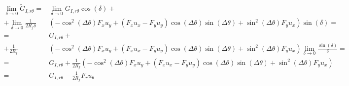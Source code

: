 \documentclass[a4paper]{jpconf}
\begin{document}
\begin{equation}
\begin{split}
\lim_{\delta\rightarrow 0}\widetilde{G}_{I,r\theta} = &\lim_{\delta\rightarrow 0}G_{I,r\theta}\cos\left(\delta\right)+\\
+\lim_{\delta\rightarrow 0}\frac{1}{2R_{f}\delta}&\left(-\cos^{2}\left(\Delta\theta\right) F_{x}u_{y}+\left(F_{x}u_{x}-F_{y}u_{y}\right)\cos\left(\Delta\theta\right)\sin\left(\Delta\theta\right)+\sin^{2}\left(\Delta\theta\right)F_{y}u_{x}\right)\sin\left(\delta\right)=\\
= &G_{I,r\theta}+\\
+\frac{1}{2R_{f}}&\left(-\cos^{2}\left(\Delta\theta\right) F_{x}u_{y}+\left(F_{x}u_{x}-F_{y}u_{y}\right)\cos\left(\Delta\theta\right)\sin\left(\Delta\theta\right)+\sin^{2}\left(\Delta\theta\right)F_{y}u_{x}\right)\lim_{\delta\rightarrow 0}\frac{\sin\left(\delta\right)}{\delta}=\\
= &G_{I,r\theta}+\frac{1}{2R_{f}}\left(-\cos^{2}\left(\Delta\theta\right) F_{x}u_{y}+\left(F_{x}u_{x}-F_{y}u_{y}\right)\cos\left(\Delta\theta\right)\sin\left(\Delta\theta\right)+\sin^{2}\left(\Delta\theta\right)F_{y}u_{x}\right)\\
= &G_{I,r\theta}-\frac{1}{2R_{f}}F_{r}u_{\theta}\\
\end{split}
\end{equation}
\end{document}
